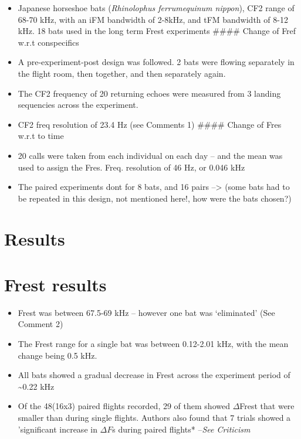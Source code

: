 \documentclass[
]{book}
\providecommand{\tightlist}{%
  \setlength{\itemsep}{0pt}\setlength{\parskip}{0pt}}
\begin{document}
\begin{itemize}
\tightlist
\item
  Japanese horseshoe bats (\emph{Rhinolophus ferrumequinum nippon}), CF2 range of 68-70 kHz, with an iFM bandwidth of 2-8kHz, and tFM bandwidth of 8-12 kHz. 18 bats used in the long term Frest experiments
  \#\#\#\# Change of Fref w.r.t conspecifics
\item
  A pre-experiment-post design was followed. 2 bats were flowing separately in the flight room, then together, and then separately again.
\item
  The CF2 frequency of 20 returning echoes were measured from 3 landing sequencies across the experiment.
\item
  CF2 freq resolution of 23.4 Hz (see Comments 1)
  \#\#\#\# Change of Fres w.r.t to time
\item
  20 calls were taken from each individual on each day -- and the mean was used to assign the Fres. Freq. resolution of 46 Hz, or 0.046 kHz
\item
  The paired experiments dont for 8 bats, and 16 pairs --\textgreater{} (some bats had to be repeated in this design, not mentioned here!, how were the bats chosen?)
\end{itemize}

\hypertarget{results-14}{%
\section{Results}\label{results-14}}

\hypertarget{frest-results}{%
\section{Frest results}\label{frest-results}}

\begin{itemize}
\tightlist
\item
  Frest was between 67.5-69 kHz -- however one bat was `eliminated' (See Comment 2)
\item
  The Frest range for a single bat was between 0.12-2.01 kHz, with the mean change being 0.5 kHz.
\item
  All bats showed a gradual decrease in Frest across the experiment period of \textasciitilde0.22 kHz
\item
  Of the 48(16x3) paired flights recorded, 29 of them showed \(\Delta\)Frest that were smaller than during single flights. Authors also found that 7 trials showed a 'significant increase in \(\Delta F\)s during paired flights* --\emph{See Criticism}
\end{itemize}
\end{document}
